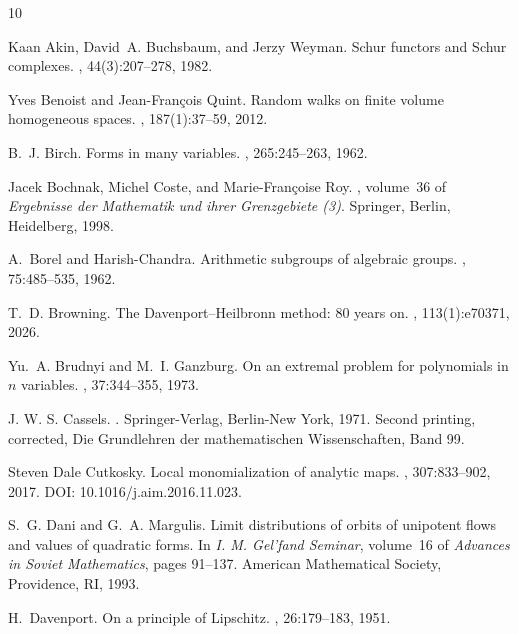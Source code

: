 \documentclass[reqno,11pt]{amsart}
\numberwithin{equation}{section}
\theoremstyle{definition}
\theoremstyle{remark}
\let\cedilla=\c %
\begin{document}
\def\cprime{$'$}
\begin{thebibliography}{10}

Kaan Akin, David~A. Buchsbaum, and Jerzy Weyman.
\newblock Schur functors and {S}chur complexes.
, 44(3):207--278, 1982.

Yves Benoist and Jean-Fran\cedilla{c}ois Quint.
\newblock Random walks on finite volume homogeneous spaces.
, 187(1):37--59, 2012.

B.~J. Birch.
\newblock Forms in many variables.
, 265:245--263, 1962.

Jacek Bochnak, Michel Coste, and Marie-Fran\cedilla{c}oise Roy.
, volume~36 of {\em Ergebnisse der Mathematik und ihrer Grenzgebiete (3)}.
\newblock Springer, Berlin, Heidelberg, 1998.

A.~Borel and Harish-Chandra.
\newblock Arithmetic subgroups of algebraic groups.
, 75:485--535, 1962.

T.~D. Browning.
\newblock The Davenport--Heilbronn method: 80 years on.
, 113(1):e70371, 2026.

Yu.~A. Brudnyi and M.~I. Ganzburg.
\newblock On an extremal problem for polynomials in $n$ variables.
, 37:344--355, 1973.

J. W. S. Cassels.
.
\newblock Springer-Verlag, Berlin-New York, 1971.
\newblock Second printing, corrected, Die Grundlehren der mathematischen Wissenschaften, Band 99.

Steven Dale Cutkosky.
\newblock Local monomialization of analytic maps.
, 307:833--902, 2017.
\newblock DOI: 10.1016/j.aim.2016.11.023.


S.~G. Dani and G.~A. Margulis.
\newblock Limit distributions of orbits of unipotent flows and values of quadratic forms.
\newblock In {\em I. M. Gel'fand Seminar}, volume~16 of {\em Advances in Soviet Mathematics}, pages 91--137. American Mathematical Society, Providence, RI, 1993.

H.~Davenport.
\newblock On a principle of Lipschitz.
, 26:179--183, 1951.


\end{thebibliography}
\end{document}
